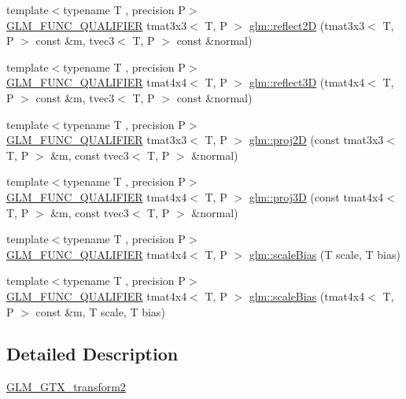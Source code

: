 \begin{DoxyCompactItemize}
\item 
{\footnotesize template$<$typename T , precision P$>$ }\\\mbox{\hyperlink{setup_8hpp_a33fdea6f91c5f834105f7415e2a64407}{G\+L\+M\+\_\+\+F\+U\+N\+C\+\_\+\+Q\+U\+A\+L\+I\+F\+I\+ER}} tmat3x3$<$ T, P $>$ \mbox{\hyperlink{namespaceglm_ac373598f80d93433e720b74e0cf8f556}{glm\+::reflect2D}} (tmat3x3$<$ T, P $>$ const \&m, tvec3$<$ T, P $>$ const \&normal)
\item 
{\footnotesize template$<$typename T , precision P$>$ }\\\mbox{\hyperlink{setup_8hpp_a33fdea6f91c5f834105f7415e2a64407}{G\+L\+M\+\_\+\+F\+U\+N\+C\+\_\+\+Q\+U\+A\+L\+I\+F\+I\+ER}} tmat4x4$<$ T, P $>$ \mbox{\hyperlink{namespaceglm_a03c85c3e6c2861030e037f7aad86eaf3}{glm\+::reflect3D}} (tmat4x4$<$ T, P $>$ const \&m, tvec3$<$ T, P $>$ const \&normal)
\item 
{\footnotesize template$<$typename T , precision P$>$ }\\\mbox{\hyperlink{setup_8hpp_a33fdea6f91c5f834105f7415e2a64407}{G\+L\+M\+\_\+\+F\+U\+N\+C\+\_\+\+Q\+U\+A\+L\+I\+F\+I\+ER}} tmat3x3$<$ T, P $>$ \mbox{\hyperlink{group__gtx__transform2_gacfce1085167a8bfb71a55ea14d22752f}{glm\+::proj2D}} (const tmat3x3$<$ T, P $>$ \&m, const tvec3$<$ T, P $>$ \&normal)
\item 
{\footnotesize template$<$typename T , precision P$>$ }\\\mbox{\hyperlink{setup_8hpp_a33fdea6f91c5f834105f7415e2a64407}{G\+L\+M\+\_\+\+F\+U\+N\+C\+\_\+\+Q\+U\+A\+L\+I\+F\+I\+ER}} tmat4x4$<$ T, P $>$ \mbox{\hyperlink{group__gtx__transform2_gafab0418f2503ec2133cb2de828cc482a}{glm\+::proj3D}} (const tmat4x4$<$ T, P $>$ \&m, const tvec3$<$ T, P $>$ \&normal)
\item 
{\footnotesize template$<$typename T , precision P$>$ }\\\mbox{\hyperlink{setup_8hpp_a33fdea6f91c5f834105f7415e2a64407}{G\+L\+M\+\_\+\+F\+U\+N\+C\+\_\+\+Q\+U\+A\+L\+I\+F\+I\+ER}} tmat4x4$<$ T, P $>$ \mbox{\hyperlink{namespaceglm_a9760927365b8beff0213eedeca8cc61d}{glm\+::scale\+Bias}} (T scale, T bias)
\item 
{\footnotesize template$<$typename T , precision P$>$ }\\\mbox{\hyperlink{setup_8hpp_a33fdea6f91c5f834105f7415e2a64407}{G\+L\+M\+\_\+\+F\+U\+N\+C\+\_\+\+Q\+U\+A\+L\+I\+F\+I\+ER}} tmat4x4$<$ T, P $>$ \mbox{\hyperlink{namespaceglm_a1837ceec02ebea68fd86b09e11a61979}{glm\+::scale\+Bias}} (tmat4x4$<$ T, P $>$ const \&m, T scale, T bias)
\end{DoxyCompactItemize}


\subsection{Detailed Description}
\mbox{\hyperlink{group__gtx__transform2}{G\+L\+M\+\_\+\+G\+T\+X\+\_\+transform2}} 